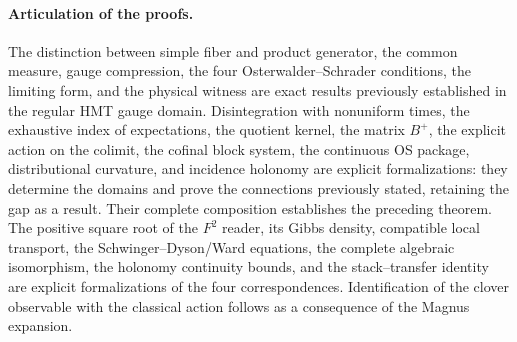 \paragraph{Articulation of the proofs.}
The distinction between simple fiber and product generator, the common measure, gauge
compression, the four Osterwalder--Schrader conditions, the limiting form, and the physical witness are
exact results previously established in the regular HMT gauge
domain. Disintegration with nonuniform times, the exhaustive
index of expectations, the quotient kernel, the matrix $B^+$, the explicit action
on the colimit, the cofinal block system, the continuous OS package, distributional
curvature, and incidence holonomy are
explicit formalizations: they determine the domains and prove the connections previously
stated, retaining the gap as a result. Their complete composition
establishes the preceding theorem.
The positive square root of the $F^2$ reader, its Gibbs density, compatible local transport,
the Schwinger--Dyson/Ward equations, the complete algebraic isomorphism, the
holonomy continuity bounds, and the stack--transfer identity are
explicit formalizations of the four correspondences. Identification
of the clover observable with the classical action follows as a consequence
of the Magnus expansion.
